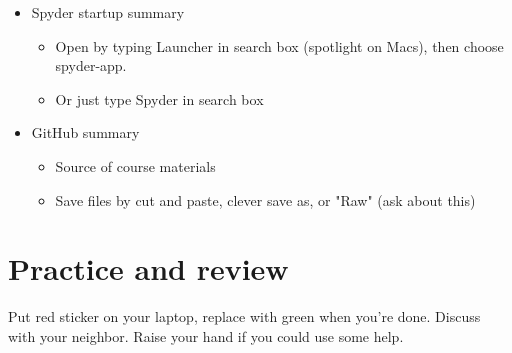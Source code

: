 \documentclass[11pt]{article}
\begin{document}
\begin{itemize}
\item Spyder startup summary
\begin{itemize}
\item Open by typing Launcher in search box (spotlight on Macs), then choose spyder-app.
\item Or just type Spyder in search box
\end{itemize}

\item GitHub summary
\begin{itemize}
\item Source of course materials
\item Save files by cut and paste, clever save as, or "Raw" (ask about this)
\end{itemize}

\end{itemize}


\section*{Practice and review}


Put red sticker on your laptop, replace with green when you're done.
Discuss with your neighbor.
Raise your hand if you could use some help.
\end{document}
